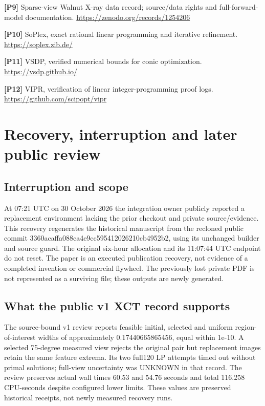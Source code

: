 \documentclass[11pt,letterpaper]{article}
\begin{document}
\begin{samepage}
\small\textbf{[P9]} Sparse-view Walnut X-ray data record; source/data rights and full-forward-model documentation. \url{https://zenodo.org/records/1254206}\par
\normalsize
\end{samepage}
\begin{samepage}
\small\textbf{[P10]} SoPlex, exact rational linear programming and iterative refinement. \url{https://soplex.zib.de/}\par
\normalsize
\end{samepage}
\begin{samepage}
\small\textbf{[P11]} VSDP, verified numerical bounds for conic optimization. \url{https://vsdp.github.io/}\par
\normalsize
\end{samepage}
\begin{samepage}
\small\textbf{[P12]} VIPR, verification of linear integer-programming proof logs. \url{https://github.com/scipopt/vipr}\par
\normalsize
\end{samepage}
\clearpage\appendix\section{Recovery, interruption and later public review}
\subsection*{Interruption and scope}
At 07:21 UTC on 30 October 2026 the integration owner publicly reported a replacement environment lacking the prior checkout and private source/evidence. This recovery regenerates the historical manuscript from the recloned public commit 3360acaffa088ca4e9cc595412026210cb4952b2, using its unchanged builder and source guard. The original six-hour allocation and its 11:07:44 UTC endpoint do not reset. The paper is an executed publication recovery, not evidence of a completed invention or commercial flywheel. The previously lost private PDF is not represented as a surviving file; these outputs are newly generated.\par
\subsection*{What the public v1 XCT record supports}
The source-bound v1 review reports feasible initial, selected and uniform region-of-interest widths of approximately 0.17440665865456, equal within 1e-10. A selected 75-degree measured view rejects the original pair but replacement images retain the same feature extrema. Its two full120 LP attempts timed out without primal solutions; full-view uncertainty was UNKNOWN in that record. The review preserves actual wall times 60.53 and 54.76 seconds and total 116.258 CPU-seconds despite configured lower limits. These values are preserved historical receipts, not newly measured recovery runs.\par
\end{document}
